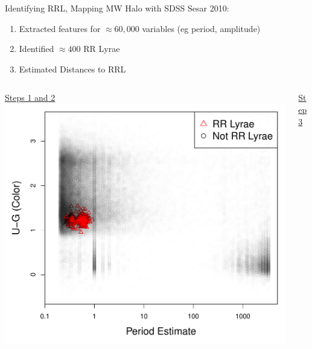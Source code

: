 \documentclass[12pt]{beamer}
\begin{document}
\begin{frame}{Identifying RRL, Mapping MW Halo with SDSS}
  Sesar 2010:
  \begin{enumerate}
  \item Extracted features for $\approx 60,000$ variables (eg period, amplitude)
  \item Identified $\approx 400$ RR Lyrae
  \item Estimated Distances to RRL
  \end{enumerate}

  \begin{columns}
    \begin{column}{0.5\textwidth}

      \vspace{.1in}
      
      \underline{Steps 1 and 2}\\
      \includegraphics[scale=.35]{figs/sdss_color_period.pdf}
    \end{column}
    \begin{column}{0.5\textwidth}
      \vspace{-.2in}
      
      \underline{Step 3}
      

\end{column}
\end{columns}
\end{frame}
\end{document}
